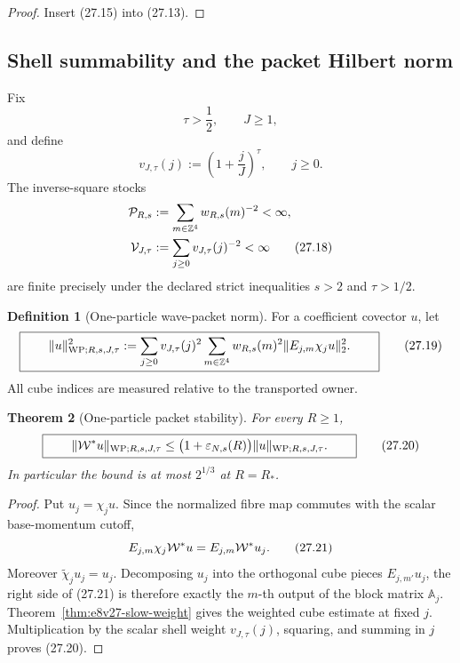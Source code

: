 \documentclass[11pt,oneside]{book}
\newtheorem{theorem}{Theorem}[chapter]
\theoremstyle{definition}
\newtheorem{definition}[theorem]{Definition}
\theoremstyle{remark}
\begin{document}
\begin{proof}
Insert (27.15) into (27.13).
\end{proof}

\subsection{Shell summability and the packet Hilbert norm}

Fix
\[
                   \tau>\frac12,\qquad J\geq1,
\]
and define
\[
 v_{J,\tau}(j):=\left(1+\frac jJ\right)^\tau,\qquad j\geq0.       \tag{27.17}
\]
The inverse-square stocks
\[
\begin{split}
 {\cal P}_{R,s}
 &:=\sum_{m\in{\mathbb Z}^4}w_{R,s}(m)^{-2}<\infty,\\
 {\cal V}_{J,\tau}
 &:=\sum_{j\geq0}v_{J,\tau}(j)^{-2}<\infty                       \tag{27.18}
\end{split}
\]
are finite precisely under the declared strict inequalities
\(s>2\) and \(\tau>1/2\).

\begin{definition}[One-particle wave-packet norm]
\label{def:e8v27-one-packet-norm}
For a coefficient covector \(u\), let
\[
\boxed{\qquad
 \|u\|_{{\rm WP};R,s,J,\tau}^2
 :=
 \sum_{j\geq0}v_{J,\tau}(j)^2
 \sum_{m\in{\mathbb Z}^4}w_{R,s}(m)^2
 \|E_{j,m}\chi_ju\|_2^2.
\qquad}                                                           \tag{27.19}
\]
All cube indices are measured relative to the transported owner.
\end{definition}

\begin{theorem}[One-particle packet stability]
\label{thm:e8v27-one-packet}
For every \(R\geq1\),
\[
\boxed{\qquad
 \|{\cal W}^*u\|_{{\rm WP};R,s,J,\tau}
 \leq
 \bigl(1+\varepsilon_{N,s}(R)\bigr)
 \|u\|_{{\rm WP};R,s,J,\tau}.
\qquad}                                                           \tag{27.20}
\]
In particular the bound is at most \(2^{1/3}\) at \(R=R_*\).
\end{theorem}

\begin{proof}
Put \(u_j=\chi_ju\).  Since the normalized fibre map commutes with
the scalar base-momentum cutoff,
\[
 E_{j,m}\chi_j{\cal W}^*u
 =E_{j,m}{\cal W}^*u_j.                                          \tag{27.21}
\]
Moreover \(\widetilde\chi_ju_j=u_j\).  Decomposing \(u_j\) into the
orthogonal cube pieces \(E_{j,m'}u_j\), the right side of (27.21) is
therefore exactly the \(m\)-th output of the block matrix
\({\mathbb A}_j\).  Theorem~\ref{thm:e8v27-slow-weight} gives the
weighted cube estimate at fixed \(j\).  Multiplication by the scalar
shell weight \(v_{J,\tau}(j)\), squaring, and summing in \(j\) proves
(27.20).
\end{proof}
\end{document}
